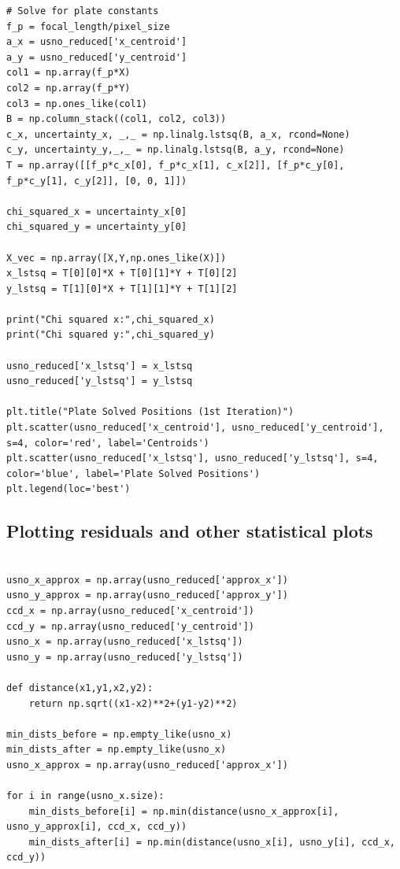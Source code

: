 \documentclass{article}
\begin{document}
\begin{appendices}
\begin{small}
\begin{verbatim}
# Solve for plate constants
f_p = focal_length/pixel_size
a_x = usno_reduced['x_centroid']
a_y = usno_reduced['y_centroid']
col1 = np.array(f_p*X)
col2 = np.array(f_p*Y)
col3 = np.ones_like(col1)
B = np.column_stack((col1, col2, col3))
c_x, uncertainty_x, _,_ = np.linalg.lstsq(B, a_x, rcond=None)
c_y, uncertainty_y,_,_ = np.linalg.lstsq(B, a_y, rcond=None)
T = np.array([[f_p*c_x[0], f_p*c_x[1], c_x[2]], [f_p*c_y[0], f_p*c_y[1], c_y[2]], [0, 0, 1]])

chi_squared_x = uncertainty_x[0] 
chi_squared_y = uncertainty_y[0] 

X_vec = np.array([X,Y,np.ones_like(X)])
x_lstsq = T[0][0]*X + T[0][1]*Y + T[0][2]
y_lstsq = T[1][0]*X + T[1][1]*Y + T[1][2]

print("Chi squared x:",chi_squared_x)
print("Chi squared y:",chi_squared_y)

usno_reduced['x_lstsq'] = x_lstsq
usno_reduced['y_lstsq'] = y_lstsq

plt.title("Plate Solved Positions (1st Iteration)")
plt.scatter(usno_reduced['x_centroid'], usno_reduced['y_centroid'], s=4, color='red', label='Centroids')
plt.scatter(usno_reduced['x_lstsq'], usno_reduced['y_lstsq'], s=4, color='blue', label='Plate Solved Positions')
plt.legend(loc='best')
\end{verbatim}
\end{small}
\subsection{Plotting residuals and other statistical plots}

\begin{small}
\begin{verbatim}

usno_x_approx = np.array(usno_reduced['approx_x'])
usno_y_approx = np.array(usno_reduced['approx_y'])
ccd_x = np.array(usno_reduced['x_centroid'])
ccd_y = np.array(usno_reduced['y_centroid'])
usno_x = np.array(usno_reduced['x_lstsq'])
usno_y = np.array(usno_reduced['y_lstsq'])

def distance(x1,y1,x2,y2):
    return np.sqrt((x1-x2)**2+(y1-y2)**2)

min_dists_before = np.empty_like(usno_x)
min_dists_after = np.empty_like(usno_x)
usno_x_approx = np.array(usno_reduced['approx_x'])

for i in range(usno_x.size):
    min_dists_before[i] = np.min(distance(usno_x_approx[i], usno_y_approx[i], ccd_x, ccd_y))
    min_dists_after[i] = np.min(distance(usno_x[i], usno_y[i], ccd_x, ccd_y))


\end{verbatim}
\end{small}
\end{appendices}
\end{document}
